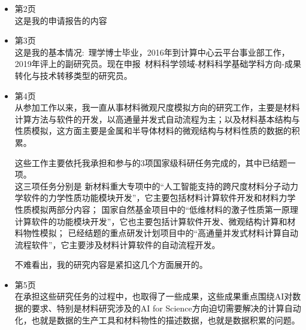 \begin{itemize}
	\item 第2页\\
这是我的申请报告的内容%
\item 第3页\\
这是我的基本情况:~理学博士毕业，2016年到计算中心云平台事业部工作，2019年评上的副研究员。现在申报~材料科学领域-材料科学基础学科方向-成果转化与技术转移类型的研究员。
\item 第4页\\
从参加工作以来，我一直从事材料微观尺度模拟方向的研究工作，主要是材料计算方法与软件的开发，以高通量并发式自动流程为主；以及材料基本结构与性质模拟，这方面主要是金属和半导体材料的微观结构与材料性质的数据的积累。

这些工作主要依托我承担和参与的3项国家级科研任务完成的，其中已结题一项。\\
这三项任务分别是
新材料重大专项中的``人工智能支持的跨尺度材料分子动力学软件的力学性质功能模块开发''，它主要包括材料计算软件开发和材料力学性质模拟两部分内容；
国家自然基金项目中的``低维材料的激子性质第一原理计算软件的功能模块开发''，它也主要包括计算软件开发、微观结构计算和材料物性模拟；
已经结题的重点研发计划项目中的``高通量并发式材料计算自动流程软件''，它主要涉及材料计算软件的自动流程开发。

不难看出，我的研究内容是紧扣这几个方面展开的。
\item 第5页\\
在承担这些研究任务的过程中，也取得了一些成果，这些成果重点围绕AI对数据的要求、特别是材料研究涉及的AI for Science方向迫切需要解决的计算自动化，也就是数据的生产工具和材料物性的描述数据，也就是数据积累的问题。


\end{itemize}
